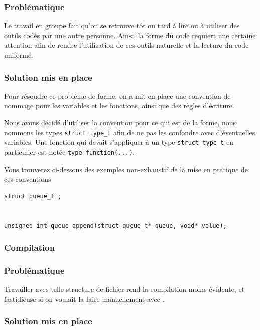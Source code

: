 \subsubsection*{Problématique}


    Le travail en groupe fait qu'on se retrouve tôt ou tard à lire ou à utiliser des outils codés par une 
autre personne. Ainsi, la forme du code requiert une certaine attention afin de rendre l'utilisation de ces
outils naturelle et la lecture du code uniforme.


\subsubsection*{Solution mis en place}

    Pour résoudre ce problème de forme, on a mit en place une convention de nommage pour les
variables et les fonctions, ainsi que des règles d'écriture. 

    Nous avons décidé d'utiliser la convention  pour ce qui est de la forme,
nous nommons les types \lstinline{struct type_t} afin de ne pas les confondre avec d'éventuelles variables.
Une fonction qui devait s'appliquer à un type \lstinline{struct type_t} en particulier est notée
\lstinline{type_function(...)}.

    Vous trouverez ci-dessous des exemples non-exhaustif de la mise en pratique de ces conventions

\begin{lstlisting}[frame=single, caption={Exemples de mise en pratique de ces conventions}]
struct queue_t ;


unsigned int queue_append(struct queue_t* queue, void* value);
\end{lstlisting}




\subsubsection*{Compilation}


\subsubsection*{Problématique}


    Travailler avec telle structure de fichier rend la compilation moins évidente, et fastidieuse si on voulait 
la faire manuellement avec .


\subsubsection*{Solution mis en place}

